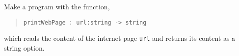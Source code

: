 Make a program with the function,
\begin{quote}
  \mbox{\lstinline!printWebPage : url:string -> string!}
\end{quote}
which reads the content of the internet page \lstinline!url! and
returns its content as a string option.
